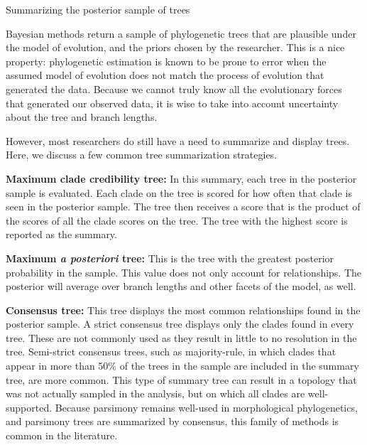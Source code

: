 \documentclass[11pt]{article}
\begin{document}
\begin{boxedtext}{Summarizing the posterior sample of trees}

Bayesian methods return a sample of phylogenetic trees that are plausible under the model of evolution, and the priors chosen by the researcher. 
This is a nice property: phylogenetic estimation is known to be prone to error when the assumed model of evolution does not match the process of evolution that generated the data.
Because we cannot truly know all the evolutionary forces that generated our observed data, it is wise to take into account uncertainty about the tree and branch lengths.

However, most researchers do still have a need to summarize and display trees. 
Here, we discuss a few common tree summarization strategies.  

\textbf{Maximum clade credibility tree:} In this summary, each tree in the posterior sample is evaluated.
Each clade on the tree is scored for how often that clade is seen in the posterior sample.
The tree then receives a score that is the product of the scores of all the clade scores on the tree.
The tree with the highest score is reported as the summary. 

\textbf{Maximum \textit{a posteriori} tree:} This is the tree with the greatest posterior probability in the sample.
This value does not only account for relationships. 
The posterior will average over branch lengths and other facets of the model, as well.

\textbf{Consensus tree:} This tree displays the most common relationships found in the posterior sample. 
A strict consensus tree displays only the clades found in every tree.
These are not commonly used as they result in little to no resolution in the tree.
Semi-strict consensus trees, such as majority-rule, in which clades that appear in more than 50\% of the trees in the sample are included in the summary tree, are more common. 
This type of summary tree can result in a topology that was not actually sampled in the analysis, but on which all clades are well-supported. 
Because parsimony remains well-used in morphological phylogenetics, and parsimony trees are summarized by consensus, this family of methods is common in the literature.



\end{boxedtext}
\end{document}
